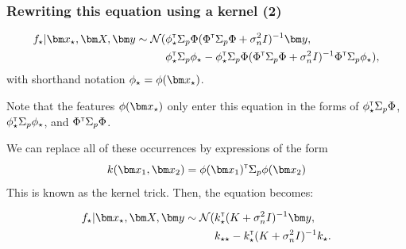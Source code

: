 \begin{frame}
\frametitle{Rewriting this equation using a kernel (2)}

\renewcommand\theequation{2.\thedefcounter}
\setcounter{defcounter}{12}
\begin{align}
f_{\star} | \bx_{\star}, \bX, \by \sim \norm (&\phi_{\star}\transpose \Sigma_p \Phi(\Phi\transpose \Sigma_p \Phi + \sigma_n^2I)^{-1}\by, \\
\nonumber{} & \phi_{\star}\transpose \Sigma_p\phi_{\star} - \phi_{\star}\transpose \Sigma_p \Phi(\Phi\transpose \Sigma_p \Phi + \sigma_n^2I)\inv
\Phi\transpose \Sigma_p \phi_{\star}),
\end{align}
%
with shorthand notation $\phi_{\star} = \phi(\bx_{\star})$.



\vspace*{0.5cm}
Note that the features $\phi(\bx_{\star})$ only enter this equation in the forms of $\phi_{\star}^{\textrm{\tiny{\sf{T}}}} \Sigma_p \Phi$, $\phi_{\star}^{\textrm{\tiny{\sf{T}}}} \Sigma_p\phi_{\star}$, and $\Phi^{\textrm{\tiny{\sf{T}}}} \Sigma_p \Phi$. 

We can replace all of these occurrences by expressions of the form 
\vspace*{-0.2cm}
\begin{equation}
\nonumber k(\bx_1, \bx_2) = \phi(\bx_1)\transpose \Sigma_p \phi(\bx_2)   
\end{equation}
\vspace*{0.1cm}
This is known as the \alert{kernel trick}. Then, the equation becomes:

\vspace*{-0.3cm}
\begin{align}
f_{\star} | \bx_{\star}, \bX, \by \sim \norm (& k_{\star}\transpose (K + \sigma_n^2I)^{-1}\by, \\
\nonumber{} & k_{\star\star} - k_{\star}\transpose(K + \sigma_n^2I)\inv
k_{\star}.
\end{align}

\end{frame}





